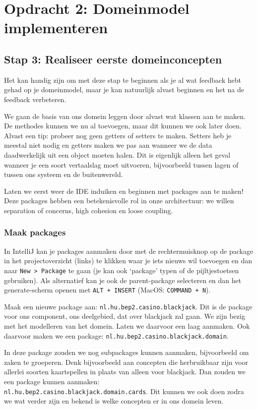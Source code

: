 \chapter{Opdracht 2: Domeinmodel implementeren}

\section{Stap 3: Realiseer eerste domeinconcepten}
Het kan handig zijn om met deze stap te beginnen als je al wat feedback hebt 
gehad op je domeinmodel, maar je kan natuurlijk alvast beginnen en het na 
de feedback verbeteren.

We gaan de basis van ons domein leggen door alvast wat klassen aan te maken.
De methodes kunnen we nu al toevoegen, maar dit kunnen we ook later doen. 
Alvast een tip: probeer nog geen getters of setters te maken. 
Setters heb je meestal niet nodig en getters maken we pas aan wanneer
we de data daadwerkelijk uit een object moeten halen. Dit is eigenlijk alleen 
het geval wanneer je een soort vertaalslag moet uitvoeren, bijvoorbeeld tussen 
lagen of tussen ons systeem en de buitenwereld.

Laten we eerst weer de IDE induiken en beginnen met packages aan te maken!
Deze packages hebben een betekenisvolle rol in onze architectuur: 
we willen separation of concerns, high cohesion en loose coupling.

\subsection{Maak packages}
In IntelliJ kan je packages aanmaken door met de rechtermuisknop op de package
in het projectoverzicht (links) te klikken waar je iets nieuws wil toevoegen
en dan naar \texttt{New > Package} te gaan 
(je kan ook `package' typen of de pijltjestoetsen gebruiken). 
Als alternatief kan je ook de parent-package selecteren en dan 
het generate-scherm openen met \texttt{ALT + INSERT} (MacOS: \texttt{COMMAND + N}). 

Maak een nieuwe package aan: \texttt{nl.hu.bep2.casino.blackjack}.
Dit is de package voor ons component, ons deelgebied, dat over blackjack zal gaan.
We zijn bezig met het modelleren van het domein. Laten we daarvoor een laag aanmaken.
Ook daarvoor maken we een package: \texttt{nl.hu.bep2.casino.blackjack.domain}.

In deze package zouden we nog subpackages kunnen aanmaken, bijvoorbeeld om zaken te groeperen.
Denk bijvoorbeeld aan concepten die herbruikbaar zijn voor allerlei soorten kaartspellen 
in plaats van alleen voor blackjack. Dan zouden we een package kunnen aanmaken: 
\\ \texttt{nl.hu.bep2.casino.blackjack.domain.cards}. Dit kunnen we ook doen zodra we 
wat verder zijn en bekend is welke concepten er in ons domein leven.


